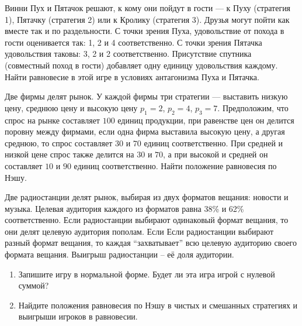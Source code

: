 \begin{exercise}
Винни Пух и Пятачок решают, к кому они пойдут в гости --- к Пуху
(стратегия 1), Пятачку (стратегия 2) или к Кролику (стратегия 3).
Друзья могут пойти как вместе так и по раздельности. С точки
зрения Пуха, удовольствие от похода в гости оценивается так: 1, 2
и 4 соответственно. С точки зрения Пятачка удовольствия таковы: 3,
2 и 2 соответственно. Присутствие спутника (совместный поход в
гости) добавляет одну единицу удовольствия каждому. Найти
равновесие в этой игре в условиях антагонизма Пуха и Пятачка.
\end{exercise}

\begin{exercise}
Две фирмы делят рынок. У каждой фирмы три стратегии --- выставить
низкую цену, среднюю цену и высокую цену $p_1=2$, $p_2=4$,
$p_3=7$. Предположим, что спрос на рынке составляет $100$ единиц
продукции, при равенстве цен он делится поровну между фирмами,
если одна фирма выставила высокую цену, а другая среднюю, то спрос
составляет $30$ и $70$ единиц соответственно. При средней и низкой
цене спрос также делится на $30$ и $70$, а при высокой и средней
он составляет $10$ и $90$ единиц соответственно. Найти положение
равновесия по Нэшу.
\end{exercise}

\begin{exercise}
Две радиостанции делят рынок, выбирая из двух форматов вещания: новости и музыка.
Целевая аудитория каждого из форматов равна 38\% и 62\% соответственно. Если радиостанции
выбирают одинаковый формат вещания, то они делят целевую аудитория пополам.
Если Если радиостанции выбирают разный формат вещания, то каждая ``захватывает''
всю целевую аудиторию своего формата вещания. Выигрыш радиостанции -- её доля аудитории.
\begin{enumerate}
	\item Запишите игру в нормальной форме. 
	Будет ли эта игра игрой с нулевой суммой? %
	\item Найдите положения равновесия по Нэшу в чистых и смешанных стратегиях
	и выигрыши игроков в равновесии.
\end{enumerate}
\end{exercise}



